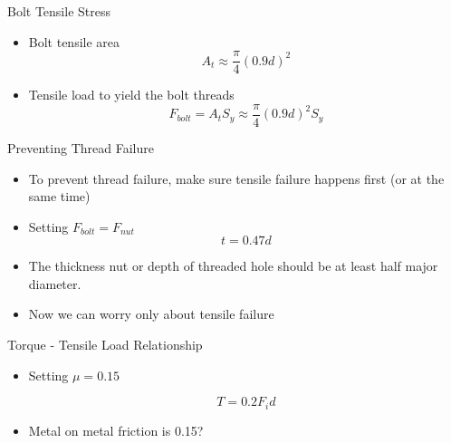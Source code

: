 \documentclass[10pt, svgnames]{beamer}
\begin{document}
\begin{frame}[label={sec:org94c8ffa}]{Bolt Tensile Stress}
\begin{itemize}
  \item Bolt tensile area
        \begin{equation*}
          A_{t} \approx \frac{\pi}{4}\left(0.9d\right)^{2}
        \end{equation*}
  \item Tensile load to yield the bolt threads
        \begin{equation*}
          F_{bolt} = A_t S_y \approx \frac{\pi}{4}(0.9d)^2 S_y
        \end{equation*}
\end{itemize}
\end{frame}

\begin{frame}[label={sec:orgf5ce50a}]{Preventing Thread Failure}
\begin{itemize}
  \item To prevent thread failure, make sure tensile failure happens first (or at the same time)
  \item Setting $F_{bolt} = F_{nut}$
  $$ t = 0.47d $$
  \item The thickness nut or depth of threaded hole should be at least half major diameter.
  \item Now we can worry only about tensile failure
\end{itemize}
\end{frame}

\begin{frame}[label={sec:orgf03309a}]{Torque - Tensile Load Relationship}
\begin{itemize}
\item Setting $\mu = 0.15$

  $$ T = 0.2{F_i}d $$

\item Metal on metal friction is 0.15?
\end{itemize}
\end{frame}
\end{document}
